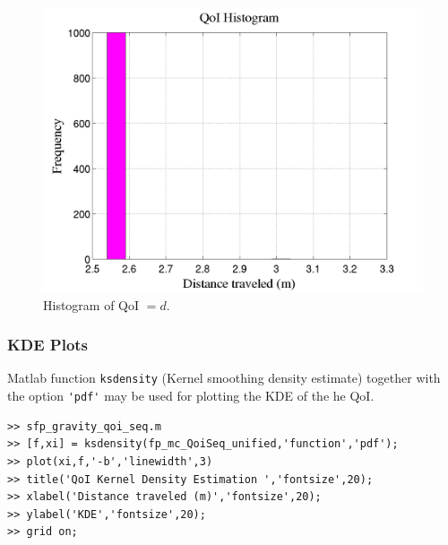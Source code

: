 \begin{figure}[htb]
\centering 
\includegraphics[scale=0.40]{rawfigs/sfp_gravity_hist.png}
\vspace{-10pt}
\caption{Histogram of QoI $=d$.}
\label{fig:sfp_gravity_hist}
\end{figure}

\subsubsection{KDE Plots}

Matlab function \verb+ksdensity+ (Kernel smoothing density estimate) together with the option \verb+'pdf'+ may be used for plotting the KDE of the he QoI.
\begin{lstlisting}[label=matlab:kde_qoi,caption={Matlab code for the QoI KDE plot.}]
% inside Matlab
>> sfp_gravity_qoi_seq.m
>> [f,xi] = ksdensity(fp_mc_QoiSeq_unified,'function','pdf');
>> plot(xi,f,'-b','linewidth',3)
>> title('QoI Kernel Density Estimation ','fontsize',20);
>> xlabel('Distance traveled (m)','fontsize',20);
>> ylabel('KDE','fontsize',20);
>> grid on;
\end{lstlisting}

